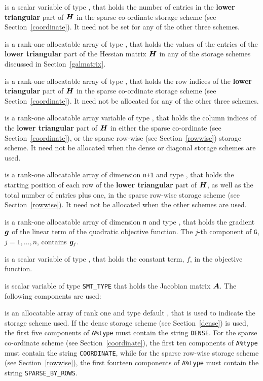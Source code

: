 \documentclass{galahad}
\begin{document}
\begin{description}
\begin{description}
 is a scalar variable of type \integer, that 
holds the number of entries in the {\bf lower triangular} part of ${\bm{H}}$
in the sparse co-ordinate storage scheme (see Section~\ref{coordinate}). 
It need not be set for any of the other three schemes.

 is a rank-one allocatable array of type \realdp, that holds
the values of the entries of the {\bf lower triangular} part
of the Hessian matrix ${\bm{H}}$ in any of the 
storage schemes discussed in Section~\ref{galmatrix}.

 is a rank-one allocatable array of type \integer,
that holds the row indices of the {\bf lower triangular} part of ${\bm{H}}$ 
in the sparse co-ordinate storage
scheme (see Section~\ref{coordinate}). 
It need not be allocated for any of the other three schemes.

 is a rank-one allocatable array variable of type \integer,
that holds the column indices of the {\bf lower triangular} part of 
${\bm{H}}$ in either the sparse co-ordinate 
(see Section~\ref{coordinate}), or the sparse row-wise 
(see Section~\ref{rowwise}) storage scheme.
It need not be allocated when the dense or diagonal storage schemes are used.

 is a rank-one allocatable array of dimension {\tt n+1} and type 
\integer, that holds the starting position of 
each row of the {\bf lower triangular} part of ${\bm{H}}$, as well
as the total number of entries plus one, in the sparse row-wise storage
scheme (see Section~\ref{rowwise}). It need not be allocated when the
other schemes are used.

\end{description}

 is a rank-one allocatable array of dimension {\tt n} and type 
\realdp, that holds the gradient ${\bm{g}}$ 
of the linear term of the quadratic objective function.
The $j$-th component of 
{\tt G}, $j = 1,  \ldots ,  n$, contains ${\bm{g}}_{j}$.

 is a scalar variable of type 
\realdp, that holds 
the constant term, $f$, in the objective function.

 is scalar variable of type {\tt SMT\_TYPE} 
that holds the Jacobian matrix ${\bm{A}}$. The following components are used:

\begin{description}

 is an allocatable array of rank one and type default \character, that
is used to indicate the storage scheme used. If the dense storage scheme 
(see Section~\ref{dense}) is used, 
the first five components of {\tt A\%type} must contain the
string {\tt DENSE}.
For the sparse co-ordinate scheme (see Section~\ref{coordinate}), 
the first ten components of {\tt A\%type} must contain the
string {\tt COORDINATE}, while 
for the sparse row-wise storage scheme (see Section~\ref{rowwise}),
the first fourteen components of {\tt A\%type} must contain the
string {\tt SPARSE\_BY\_ROWS}.


\end{description}
\end{description}
\end{document}
